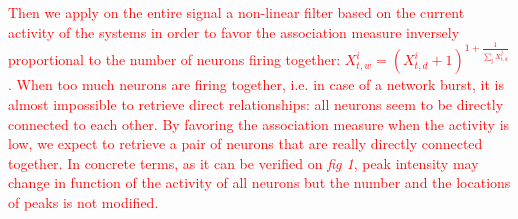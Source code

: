 \documentclass[wcp]{jmlr}
\begin{document}




\textcolor{red}{Then we apply on the entire signal a non-linear filter based on the
current activity of the systems in order to favor the association measure inversely
proportional to the number of neurons firing together:
$ X_{t,w}^i  = (X_{t,d}^i + 1 )^{1 + \frac{1}{\sum_{j} X_{t,d}^j}} $.
When too much neurons are firing together, i.e. in case of a network burst, it is almost
impossible to retrieve direct relationships: all neurons seem to be directly
connected to each other. By favoring the association measure when the activity is low,
we expect to retrieve a pair of neurons that are really directly connected together.
In concrete terms, as it can be verified on \textit{fig 1}, peak intensity may change in function
of the activity of all neurons but the number and the locations of peaks is not modified.
}





\end{document}
